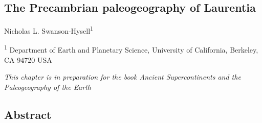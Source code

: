 \documentclass[11pt,letterpaper]{article}
\begin{document}
\begin{flushleft}
\section{The Precambrian paleogeography of Laurentia}

Nicholas L. Swanson-Hysell\textsuperscript{1}

\bigskip

\textsuperscript{1} Department of Earth and Planetary Science, University of California, Berkeley, CA 94720 USA

\end{flushleft}

\noindent\textit{This chapter is in preparation for the book Ancient Supercontinents and the Paleogeography of the Earth}

\linenumbers

\subsection{Abstract}
\end{document}
